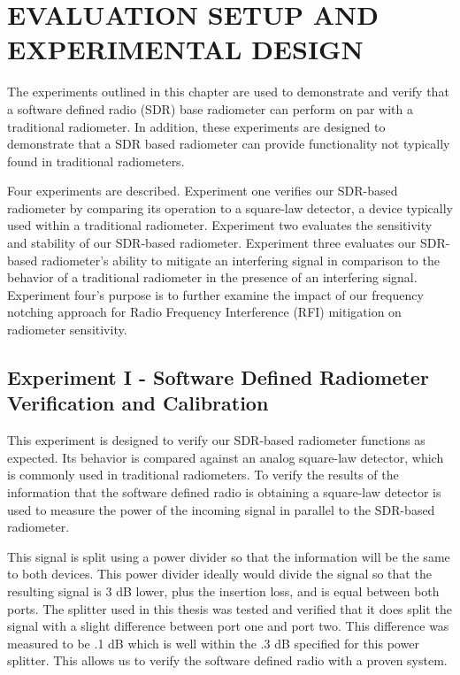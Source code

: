 

\chapter{EVALUATION SETUP AND EXPERIMENTAL DESIGN}\label{ch:exp_design}
The experiments outlined in this chapter are used to demonstrate and verify that a software defined radio (SDR) base radiometer can perform on par with a traditional radiometer.  In addition, these experiments are designed to demonstrate that a SDR based radiometer can provide functionality not typically found in traditional radiometers. 

Four experiments are described.  Experiment one verifies our SDR-based radiometer by comparing its operation to a square-law detector, a device typically used within a traditional radiometer.  Experiment two evaluates the sensitivity and stability of our SDR-based radiometer.  Experiment three evaluates our SDR-based radiometer's ability to mitigate an interfering signal in comparison to the behavior of a traditional radiometer in the presence of an interfering signal.  Experiment four's purpose is to further examine the impact of our frequency notching approach for Radio Frequency Interference (RFI) mitigation on radiometer sensitivity.

\section{Experiment I - Software Defined Radiometer Verification and Calibration}\label{Exp1}

This experiment is designed to verify our SDR-based radiometer functions as expected.  Its behavior is compared against an analog square-law detector, which is commonly used in traditional radiometers.  To verify the results of the information that the software defined radio is obtaining a square-law detector is used to measure the power of the incoming signal in parallel to the SDR-based radiometer.  

This signal is split using a power divider so that the information will be the same to both devices.  This power divider ideally would divide the signal so that the resulting signal is 3 dB lower, plus the insertion loss, and is equal between both ports.  The splitter used in this thesis was tested and verified that it does split the signal with a slight difference between port one and port two.  This difference was measured to be .1 dB which is well within the .3 dB specified for this power splitter.  This allows us to verify the software defined radio with a proven system.  

